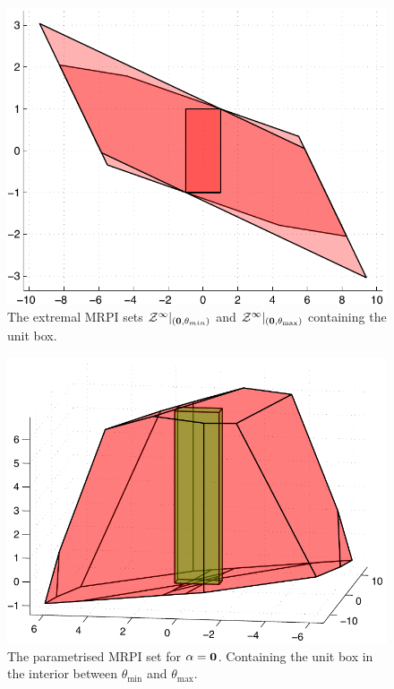 \documentclass[letterpaper, 10pt, conference]{ieeeconf} %
\begin{document}
\begin{figure}
\centerline{\includegraphics[scale=0.6]{twoDimensional}}
\caption{The extremal MRPI sets $\mathcal Z^\infty\vert_{({\bf{0}},\theta_{min})}$ and $\mathcal Z^\infty
\vert_{({\bf{0}},\theta_{\max})}$ containing the unit box.}
\label{fig:two:dim:example}
\end{figure}
\begin{figure}
\centerline{\includegraphics[scale=0.6]{threeDimensional}}
\caption{The parametrised MRPI set for $\alpha={\bf{0}}$. Containing the unit box in the 
interior between $\theta_{\min}$ and $\theta_{\max}$.}
\label{fig:three:dim:example}
\end{figure}
%
%
%
\end{document}

